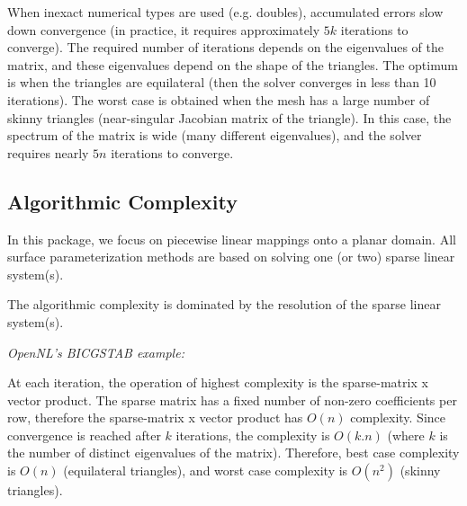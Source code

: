 When inexact numerical types are used (e.g. doubles), accumulated errors slow down convergence
(in practice, it requires approximately $5k$ iterations to converge).
The required number of iterations depends on the eigenvalues of the matrix, and these eigenvalues depend
on the shape of the triangles. The optimum is when the triangles are equilateral (then the solver converges
in less than 10 iterations). The worst case is obtained when the mesh has a large number of skinny triangles (near-singular Jacobian matrix of the triangle). In this case, the spectrum of the matrix
is wide (many different eigenvalues), and the solver requires nearly $5n$ iterations to converge.


\subsection{Algorithmic Complexity}

In this package, we focus on piecewise linear mappings onto a planar
domain. All surface parameterization methods are based on solving one (or two)
sparse linear system(s).

The algorithmic complexity is dominated by the resolution of the sparse linear system(s).

\emph{OpenNL's BICGSTAB example:}

At each iteration, the operation of highest complexity is the sparse-matrix x vector product.
The sparse matrix has a fixed number of non-zero coefficients per row,
therefore the sparse-matrix x vector product has $O(n)$ complexity.
Since convergence is reached after $k$ iterations, the complexity is $O(k.n)$
(where $k$ is the number of distinct eigenvalues of the matrix).
Therefore, best case complexity is $O(n)$ (equilateral triangles),
and worst case complexity is $O(n^2)$ (skinny triangles).

